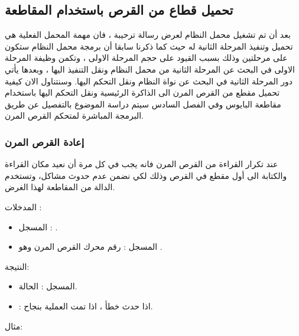 \documentclass[document.tex]{subfiles}
\begin{document}
\subsection{تحميل قطاع من القرص باستخدام المقاطعة }

بعد أن تم تشغيل محمل النظام لعرض رسالة ترحيبة ، فان مهمة المحمل الفعلية هي تحميل وتنفيذ المرحلة الثانية له حيث كما ذكرنا سابقا أن برمجة محمل النظام ستكون على مرحلتين وذلك بسبب القيود على حجم المرحلة الاولى ، وتكمن وظيفة المرحلة الاولى في البحث عن المرحلة الثانية من محمل النظام ونقل التنفيذ اليها ، وبعدها يأتي دور المرحلة الثانية في البحث عن نواة النظام ونقل التحكم اليها. وسنتناول الان كيفية تحميل مقطع من القرص المرن الى الذاكرة الرئيسية ونقل التحكم اليها باستخدام مقاطعة البايوس  وفي الفصل السادس سيتم دراسة الموضوع بالتفصيل عن طريق البرمجة المباشرة  لمتحكم  القرص المرن.

\subsubsection{إعادة القرص المرن}
عند تكرار القراءة من القرص المرن فانه يجب في كل مرة أن نعيد مكان القراءة والكتابة الى أول مقطع  في القرص وذلك لكي نضمن عدم حدوث مشاكل، وتستخدم الدالة  من المقاطعة  لهذا الغرض.

المدخلات :
\begin{itemize}
\item المسجل   : .
\item المسجل  : رقم محرك القرص المرن وهو .
\end{itemize}
النتيجة:
\begin{itemize}
\item المسجل  : الحالة.
\item {} :  اذا حدث خطأ ،  اذا تمت العملية بنجاح.

\end{itemize}

مثال:
\begin{english}
\lstset{numberstyle=\tiny,numbersep=5pt,tabsize=2,extendedchars=true,breaklines=true,frame=b,showspaces=false, showtabs=false,xleftmargin=10pt,framexleftmargin=10pt,framexrightmargin=5pt,framexbottommargin=4pt,showstringspaces=false,language=[x86masm]Assembler}


\end{english}
\end{document}
